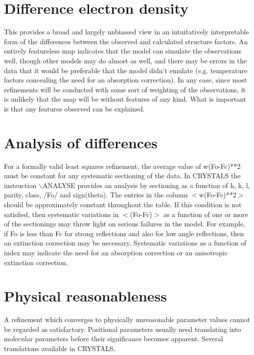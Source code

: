 \documentclass[10pt,a4paper]{report}
\begin{document}
\section{Difference electron density}


This provides a broad and largely unbiassed view in an intuitatively 
 interpretable form  of the differences between the observed and calculated
 structure factors. An entirely featureless map indicates that the model
 can simulate the observations well, though other models may do almost as
 well, and there may be errors in the data that it would be preferable that
 the model didn't emulate (e.g. temperature factors concealing the need for
 an absorption correction). In any case, since most refinements will be 
 conducted with some sort of weighting of the observations, it is unlikely
 that the map will be without features of any kind. What is important is that
 any features observed can be explained.



\section{Analysis of differences}


For a formally valid least squares refinement, the average value of
 w(Fo-Fc)**2 must be constant for any systematic sectioning of the data. In 
 CRYSTALS the instruction $\backslash$ANALYSE provides an analysis  by sectioning as
 a function of h, k, l, parity, class, /Fo/ and sign(theta). The entries in
 the column $<$w(Fo-Fc)**2$>$  should be approximately constant 
 throughout the table. If this condition is  not satisfied,
 then systematic variations in $<$(Fo-Fc)$>$
 as a function of one or more of the sectionings may throw light on serious
 failures in the model. For example, if Fo is less than Fc for strong
 reflections and also for low angle reflections, then an extinction correction
 may be necessary. Systematic variations as a function of index may indicate
 the need for an absorption correction or an anisotropic extinction correction.
\section{Physical reasonableness}


A refinement which converges to physically unreasonable parameter values
 cannot be regarded as satisfactory. Positional parameters usually need
 translating into molecular parameters before their significance becomes
 apparent. Several translations available in CRYSTALS.
\end{document}
